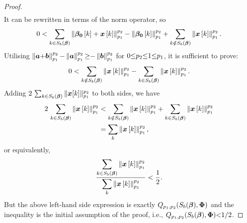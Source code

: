 \begin{proof}
\begin{gather*}
\end{gather*}
It can be rewritten in terms of the norm operator, so
\begin{gather*}
 0<\displaystyle\sum_{k \in S_b\left( \boldsymbol{\beta} \right)} \left\lVert\boldsymbol{\beta_0}\left[ k \right]+\boldsymbol{x}\left[ k \right]\right\rVert_{p_1}^{p_2} - 
\left\lVert\boldsymbol{\beta_0}\left[ k \right]\right\rVert_{p_1}^{p_2} + 
\displaystyle\sum_{k \notin S_b\left( \boldsymbol{\beta} \right)} \left\lVert\boldsymbol{x}\left[ k \right]\right\rVert_{p_1}^{p_2}.
\end{gather*}
Utilising $\left\lVert\boldsymbol{a} {+} \boldsymbol{b}\right\rVert_{p_1}^{p_2} {-} \left\lVert\boldsymbol{a}\right\rVert_{p_1}^{p_2} {\geq} {-}\left\lVert\boldsymbol{b}\right\rVert_{p_1}^{p_2}$ for $0 {\leq} p_2 {\leq} 1 {\leq} p_1$, it is sufficient to prove:
\begin{equation*}
 0 < \displaystyle\sum_{k \notin S_b\left( \boldsymbol{\beta} \right)} \left\lVert\boldsymbol{x}\left[ k \right]\right\rVert_{p_1}^{p_2} - \displaystyle\sum_{k \in S_b\left( \boldsymbol{\beta} \right)} \left\lVert\boldsymbol{x}\left[ k \right]\right\rVert_{p_1}^{p_2}.
\end{equation*}
Adding $2 \, \sum_{k \in S_b(\boldsymbol{\beta})} \Vert \boldsymbol{x}[k] \Vert_{p_1}^{p_2}$ to both sides, we have
\begin{gather*}
\begin{aligned}
2 \, \displaystyle\sum_{k \in S_b\left( \boldsymbol{\beta} \right)} \left\lVert\boldsymbol{x}\left[ k \right]\right\rVert_{p_1}^{p_2} &< 
\displaystyle\sum_{k \notin S_b\left( \boldsymbol{\beta} \right)} \left\lVert\boldsymbol{x}\left[ k \right]\right\rVert_{p_1}^{p_2} + \displaystyle\sum_{k \in S_b\left( \boldsymbol{\beta} \right)} \left\lVert\boldsymbol{x}\left[ k \right]\right\rVert_{p_1}^{p_2} \\
&= \displaystyle\sum_{k} \left\lVert\boldsymbol{x}\left[ k \right]\right\rVert_{p_1}^{p_2},
\end{aligned}
\end{gather*}
or equivalently,
\begin{equation*}
\frac{\displaystyle\sum_{k \in S_b\left( \boldsymbol{\beta} \right)} \left\lVert\boldsymbol{x}\left[ k \right]\right\rVert_{p_1}^{p_2}}{\displaystyle\sum_{k} \left\lVert\boldsymbol{x}\left[ k \right]\right\rVert_{p_1}^{p_2}} < \frac12.
\end{equation*}
But the above left-hand side expression is exactly $Q_{p_1,p_2}(S_b(\boldsymbol{\beta}),\boldsymbol{\Phi})$ and the inequality is the initial assumption of the proof, i.e., $Q_{p_1,p_2}(S_b(\boldsymbol{\beta}),\boldsymbol{\Phi}) {<} 1/2$.
\end{proof}